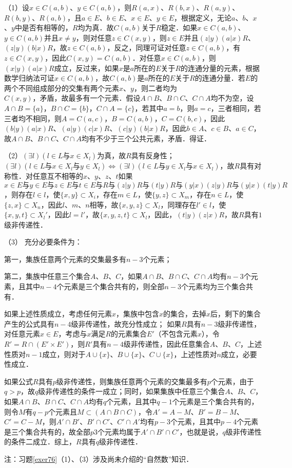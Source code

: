 \documentclass[12pt, a4paper, oneside]{book}
\begin{document}
			（1）设$x\in C(a, b)$、$y\in C(a, b)$，则$R(a, x)$、$R(b, x)$、$R(a, y)$、$R(b, y)$、$R(a, b)$，且$a\in E$、$b\in E$、$x\in E$、$y\in E$，根据定义，无论$a$、$b$、$x$、$y$中是否有相等的，$R$均为真．故$C(a, b)$关于$R$稳定．如果$x\in C(a, b)$、$y\in C(a, b)$并且$x\neq y$，则对任意$z\in C(x, y)$，则$z\in E$并且$(z|y)(a|x)R$、$(z|y)(b|x)R$，故$z\in C(a, b)$，反之，同理可证对任意$z\in C(a, b)$，有$z\in C(x, y)$，因此$C(x, y)=C(a, b)$．对任意$x\in C(a, b)$，则$(x|y)(a|x)R$成立，反过来，如果$x$是$a$所在的$E$关于$R$的连通分量的元素，根据数学归纳法可证$x\in C(a, b)$，故$C(a, b)$是$a$所在的$E$关于$R$的连通分量．若$E$的两个不同组成部分的交集有两个元素$x$、$y$，则二者均为\\$C(x, y)$，矛盾，故最多有一个元素．假设$A\cap B$、$B\cap C$、$C\cap A$均不为空，设$A\cap B=\{a\}$，$B\cap C=\{b\}$，$C\cap A=\{c\}$，若其中$a=b$，则$a=c$，三者相同，若三者均不相同，则$A=C(a, c)$，$B=C(a, b)$，$C=C(b, c)$，因此$(b|y)(a|x)R$、$(a|y)(c|x)R$、$(c|y)(b|x)R$，因此$b\in A$、$c\in B$、$a\in C$，故$A\cap B$、$B\cap C$、$C\cap A$均有不少于三个公共元素，矛盾．得证．
			\par
			（2）$(\exists l)(l\in L\text{与}x\in X_l)$为真，故$R$具有反身性；$(\exists l)(l\in L\text{与}x\in X_l\text{与}y\in X_l)\Leftrightarrow (\exists l)(l\in L\text{与}y\in X_l\text{与}x\in X_l)$，故$R$具有对称性．对任意互不相等的$x$、$y$、$z$、$t$如果$x\in E\text{与}y\in E\text{与}z\in E\text{与}t\in E\text{与}R\text{与}(z|y)R\text{与}(t|y)R\text{与}(y|x)(z|y)R\text{与}(y|x)(t|y)R$，则存在$l\in l$，使$\{x, y\}\subset X_i$，存在$m\in L$，使$\{y, z\}\subset X_m$，存在$n\in L$，使$\{z, x\}\subset X_n$，因此$l$、$m$、$n$相等，故$\{x, y, z\}\subset X_l$，同理存在$l' \in l$，使$\{x, y, t\}\subset X_l'$，因此$l=l'$，故$\{x, y, z, t\}\subset X_l$，因此，$(t|y)(z|x)R$，故$R$具有$1$级非传递性．
			\par
			（3）	充分必要条件为：
			\par
			第一，集族任意两个元素的交集最多有$n-3$个元素；
			\par
			第二，集族中任意三个集合$A$、$B$、$C$，如果$A\cap B$、$B\cap C$、$C\cap A$均有$n-3$个元素，且其中$n-4$个元素是三个集合共有的，则全部$n-3$个元素均为三个集合共有．
			\par
			如果上述性质成立，考虑任何元素$x$，集族中包含$x$的集合，去掉$x$后，剩下的集合产生的公式具有$n-4$级非传递性，故充分性成立；
			如果$R$具有$n-3$级非传递性，对任意元素$x\in E$，考虑与$x$满足$R$的元素集合$E'$（不包含元素$x$），令$R'=R\cap (E'\times E')$，则$R'$具有$n-4$级非传递性，因此任意集合$A$、$B$、$C$，上述性质对$n-1$成立，则对于$A\cup\{x\}$、$B\cup\{x\}$、$C\cup\{x\}$，上述性质对$n$成立，必要性成立．
			\par
			如果公式$R$具有$p$级非传递性，则集族任意两个元素的交集最多有$p$个元素，由于$q>p$，故$q$级非传递性的条件一成立；同时，如果集族中任意三个集合$A$、$B$、$C$，如果$A\cap B$、$B\cap C$、$C\cap A$均有$q$个元素，且其中$q-1$个元素是三个集合共有的，则令$M$有$q-p$个元素且$M\subset (A\cap B\cap C)$，令$A'=A-M$、$B'=B-M$、$C'=C-M$，则$A'\cap B'$、$B'\cap C'$、$C'\cap A'$均有$p-3$个元素，且其中$p-4$个元素是三个集合共有的，故全部$p3$个元素均属于$A'\cap B'\cap C'$，也就是说，$q$级非传递性的条件二成立．综上，$R$具有$q$级非传递性．
			\par
			注：习题\ref{exer76}（1）、（3）涉及尚未介绍的“自然数”知识．
		
\end{document}
